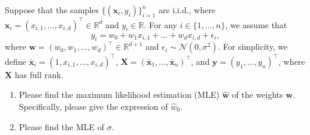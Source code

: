 \documentclass[11pt,letter,notitlepage]{article}
\theoremstyle{definition}
\begin{document}
	\begin{solution}
		
	\end{solution}

	
	
	\newpage
	
	
	
	\begin{exercise}\label{Exe5}
		Suppose that the samples $\{(\mathbf{x}_i,y_i)\}^n_{i=1}$ are i.i.d., where $\mathbf{x}_i =(x_{i,1}, \dots, x_{i,d})^{\top} \in \mathbb{R}^d$  and $y_i \in \mathbb{R}$. For any $i\in \{1,\dots, n\}$, we assume that 
		$$y_i =  w_0 + w_1 x_{i,1} +\dots + w_d x_{i,d} + \epsilon_i,$$
		where $\mathbf{w} = (w_0,w_1,\dots,w_d)^{\top}\in \mathbb{R}^{d+1}$ and $\epsilon_i\sim \mathcal{N}(0,\sigma^2)$. For simplicity, we define $\bar{\mathbf{x}}_i = (1, x_{i,1}, \dots, x_{i,d})^\top$, $ \mathbf{X}=(\bar{\mathbf{x}}_1,\dots,\bar{\mathbf{x}}_n)^\top$, and $\mathbf{y}=(y_1,\dots,y_n)^\top$, where $\mathbf{X}$ has full rank.
		\begin{enumerate}
			\item Please find the maximum likelihood estimation (MLE) $\hat{\mathbf{w}}$ of the weights $\mathbf{w}$. Specifically, please give the expression of $\hat{w}_0$.
			\item Please find the MLE of $\sigma$.
		\end{enumerate}
	\end{exercise}
	\begin{solution}
		
	\end{solution}
	
\end{document}

